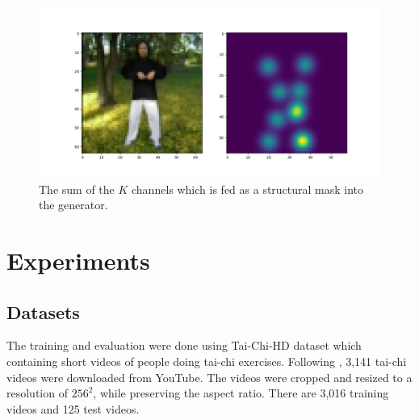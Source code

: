 \documentclass{article}
\begin{document}
\begin{figure}[ht]
\vskip 0.2in
\begin{center}
\centerline{\includegraphics[width=\columnwidth]{softmax_sumkp}}
\caption{
The sum of the $K$ channels which is fed as a structural mask into the
generator.
}
\label{softmax-sum}
\end{center}
\vskip -0.2in
\end{figure}

\section{Experiments}
\subsection{Datasets}
The training and evaluation were done using Tai-Chi-HD dataset which containing short videos of people doing tai-chi exercises. Following \cite{siarohin2020order}, 3,141 tai-chi videos were downloaded from YouTube. The videos were cropped and resized to a resolution of $256^2$, while preserving the aspect ratio. There are 3,016 training videos and 125 test videos.
\end{document}
